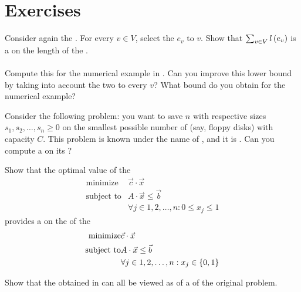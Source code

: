 \section*{Exercises}
\begin{exercise}
Consider again the . For every  $v\in V$, select the  $e_v$  to $v$. Show that $\isumdomain[v]{V}{\fun{l}{e_v}}$ is a  on the length of the .
\paragraph{}
Compute this  for the numerical example in . Can you improve this lower bound by taking into account the two   to every  $v$? What bound do you obtain for the numerical example?
\end{exercise}
\begin{exercise}
Consider the following problem: you want to save $n$  with respective sizes $s_1,s_2,\ldots,s_n\geq 0$ on the smallest possible number of  (say, floppy disks) with capacity $C$. This problem is known under the name of , and it is . Can you compute a  on its ?
\end{exercise}
\begin{exercise}
Show that the optimal value of the 
\begin{eqnarray}
\mbox{minimize}&\vec{c}\cdot\vec{x}\\
\mbox{subject to}&A\cdot\vec{x}\leq\vec{b}\\
&\forall j\in1,2,\ldots,n:0\leq x_j\leq 1
\end{eqnarray}
provides a  on the  of the 
\begin{eqnarray}
\mbox{minimize}&\vec{c}\cdot\vec{x}\\
\mbox{subject to}&A\cdot\vec{x}\leq\vec{b}\\
&\forall j\in1,2,\ldots,n:x_j\in\accl{0,1}
\end{eqnarray}
\end{exercise}
\begin{exercise}
Show that the  obtained in  can all be viewed as  of a  of the original problem.
\end{exercise}
